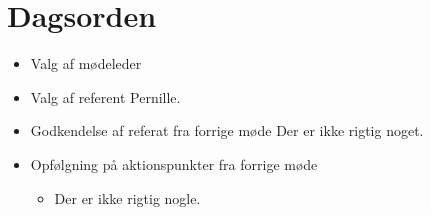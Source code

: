 \documentclass{article}
\begin{document}
	\section{Dagsorden}
	\begin{itemize}
		\item Valg af mødeleder
		
		
		\item Valg af referent
		Pernille. 
		
		\item Godkendelse af referat fra forrige møde 
		Der er ikke rigtig noget. 
		
		\item Opfølgning på aktionspunkter fra forrige møde
		\begin{itemize}
			\item Der er ikke rigtig nogle. 
		\end{itemize}
		

\end{itemize}
\end{document}
